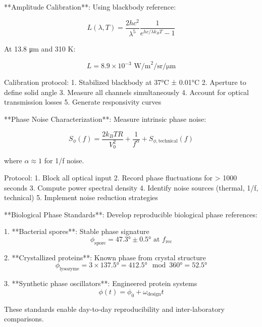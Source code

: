 \documentclass[12pt,a4paper]{report}
\begin{document}
**Amplitude Calibration**: Using blackbody reference:

\begin{equation}
L(\lambda, T) = \frac{2hc^2}{\lambda^5} \frac{1}{e^{hc/\lambda k_B T} - 1}
\end{equation}

At 13.8 μm and 310 K:

\begin{equation}
L = 8.9 \times 10^{-3} \text{ W/m}^2\text{/sr/μm}
\end{equation}

Calibration protocol:
1. Stabilized blackbody at 37°C ± 0.01°C
2. Aperture to define solid angle
3. Measure all channels simultaneously
4. Account for optical transmission losses
5. Generate responsivity curves

**Phase Noise Characterization**: Measure intrinsic phase noise:

\begin{equation}
S_\phi(f) = \frac{2k_B T R}{V_0^2} + \frac{1}{f^\alpha} + S_{\phi,\text{technical}}(f)
\end{equation}

where $\alpha \approx 1$ for 1/f noise.

Protocol:
1. Block all optical input
2. Record phase fluctuations for > 1000 seconds
3. Compute power spectral density
4. Identify noise sources (thermal, 1/f, technical)
5. Implement noise reduction strategies

**Biological Phase Standards**: Develop reproducible biological phase references:

1. **Bacterial spores**: Stable phase signature
   \begin{equation}
   \phi_{\text{spore}} = 47.3° \pm 0.5° \text{ at } f_{\text{rec}}
   \end{equation}

2. **Crystallized proteins**: Known phase from crystal structure
   \begin{equation}
   \phi_{\text{lysozyme}} = 3 \times 137.5° = 412.5° \mod 360° = 52.5°
   \end{equation}

3. **Synthetic phase oscillators**: Engineered protein systems
   \begin{equation}
   \phi(t) = \phi_0 + \omega_{\text{design}} t
   \end{equation}

These standards enable day-to-day reproducibility and inter-laboratory comparisons.
\end{document}
